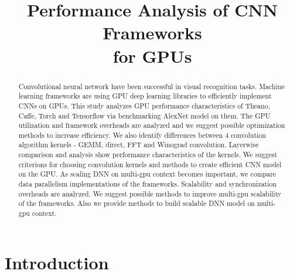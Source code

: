 \documentclass[conference]{IEEEtran}
\begin{document}
\title{Performance Analysis of CNN Frameworks\\for GPUs}

\author{
\and
{}
}

\maketitle

\begin{abstract}
Convolutional neural network have been successful in visual recognition tasks.
Machine learning frameworks are using GPU deep learning libraries to efficiently implement CNNs on GPUs.
This study analyzes GPU performance characteristics of Theano, Caffe, Torch and Tensorflow via benchmarking AlexNet model on them.
The GPU utilization and framework overheads are analyzed and we suggest possible optimization methods to increase efficiency.
We also identify differences between 4 convolution algorithm kernels - GEMM, direct, FFT and Winograd convolution.
Layerwise comparison and analysis show performance characteristics of the kernels.
We suggest criterions for choosing convolution kernels and methods to create efficient CNN model on the GPU.
As scaling DNN on multi-gpu context becomes important, we compare data parallelism implementations of the frameworks.
Scalability and synchronization overheads are analyzed.
We suggest possible methods to improve multi-gpu scalability of the frameworks.
Also we provide methods to build scalable DNN model on multi-gpu context.

\end{abstract}

\IEEEpeerreviewmaketitle

\section{Introduction}
\end{document}
